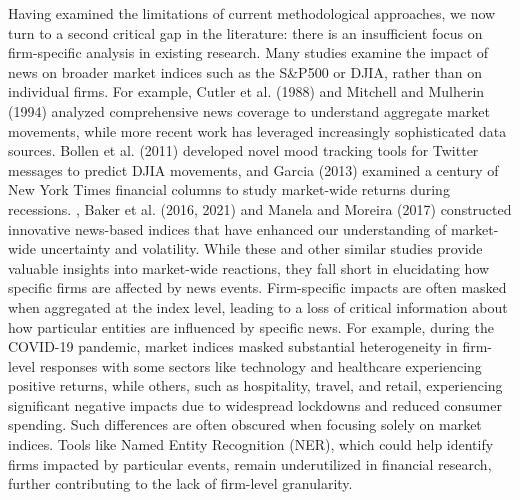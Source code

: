 \mx
Having examined the limitations of current methodological approaches, we now turn to a second critical gap in the literature: there is an insufficient focus on firm-specific analysis in existing research. Many studies examine the impact of news on broader market indices
 such as the S\&P500 or DJIA, rather than on individual firms. 
For example, 
\cite{cutler1988moves}  Cutler et al. (1988) 
and 
\cite{mitchell1994impact}  Mitchell and Mulherin (1994) 
analyzed comprehensive news coverage to understand aggregate market movements, while more recent work has leveraged increasingly sophisticated data sources. 
\cite{bollen2011twitter} Bollen et al. (2011) 
developed novel mood tracking tools for Twitter messages to predict DJIA movements, and 
\cite{garcia2013sentiment} Garcia (2013) 
examined a century of New York Times financial columns to study market-wide returns during recessions. 
\cite{baker2016measuring}, \cite{baker2021triggers} Baker et al. (2016, 2021) 
and 
\cite{manela2017news} Manela and Moreira (2017) 
constructed innovative news-based indices that have enhanced our understanding of market-wide uncertainty and volatility.
While these and other similar studies provide valuable insights into market-wide reactions, they fall short in elucidating how specific firms are affected by news events. Firm-specific impacts are often masked when aggregated at the index level, leading to a loss of critical information about how particular entities are influenced by specific news. 
For example, during the COVID-19 pandemic, market indices masked substantial heterogeneity in firm-level responses
 with some sectors like technology and healthcare experiencing positive returns, while others, such as hospitality, travel, and retail, experiencing significant negative impacts due to widespread lockdowns and reduced consumer spending. 
Such differences are often obscured when focusing solely on market indices. Tools like Named Entity Recognition (NER), which could help identify firms impacted by particular events, remain underutilized in financial research, further contributing to the lack of firm-level granularity.


